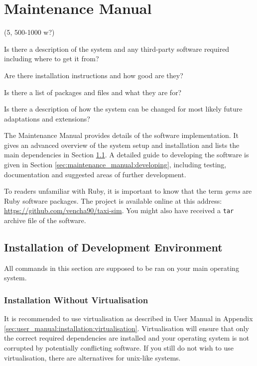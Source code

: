 \clearpage
\section{Maintenance Manual}
\label{sec:maintenance_manual}

(5, 500-1000 w?)

Is there a description of the system and any third-party software required
including where to get it from?

Are there installation instructions and how good are they?

Is there a list of packages and files and what they are for?

Is there a description of how the system can be changed for most likely future
adaptations and extensions?


The Maintenance Manual provides details of the software implementation. It
gives an advanced overview of the system setup and installation and lists the
main dependencies in Section \ref{sec:maintenance_manual:installation}. A
detailed guide to developing the software is given in Section
\ref{sec:maintenance_manual:developing}, including testing, documentation and
suggested areas of further development.


 To readers unfamiliar with Ruby, it is important to know that the term
\textit{gems} are Ruby software packages. The project is available online at
this address: \url{https://github.com/vencha90/taxi-sim}. You might also have
received a \texttt{tar} archive file of the software.

\subsection{Installation of Development Environment}
\label{sec:maintenance_manual:installation}

All commands in this section are supposed to be ran on your main operating
system.


\subsubsection{Installation Without Virtualisation}
\label{sec:maintenance_manual:native_install}

It is recommended to use virtualisation as described in User Manual in Appendix
\ref{sec:user_manual:installation:virtualisation}. Virtualisation will ensure
that only the correct required dependencies are installed and your operating
system is not corrupted by potentially conflicting software. If you still do
not wish to use virtualisation, there are alternatives for unix-like systems.

